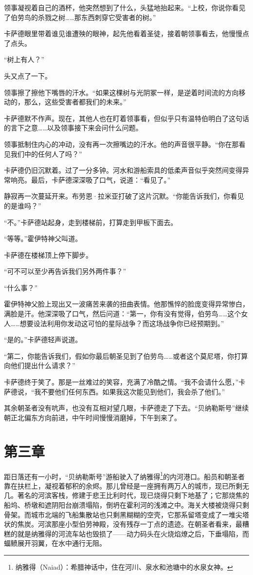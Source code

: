 \documentclass[AutoFakeBold=true]{book}
\begin{document}
领事凝视着自己的酒杯，他突然想到了什么，头猛地抬起来。``上校，你说你看见了伯劳鸟的杀戮之树……那东西刺穿它受害者的树。''

卡萨德眼里带着谁见谁遭殃的眼神，起先他看着圣徒，接着朝领事看去，他慢慢点了点头。

``树上有人？''

头又点了一下。

领事擦了擦他下嘴唇的汗水。``如果这棵树与光阴冢一样，是逆着时间流的方向移动的，那么，这些受害者都我们的未来。''

卡萨德默不作声。现在，其他人也在盯着领事看，但似乎只有温特伯明白了这句话的言下之意……以及领事接下来会问什么问题。

领事抵制住内心的冲动，没有再一次擦嘴边的汗水。他的声音很平静。``你在那看见我们中的任何人了吗？''

卡萨德仍旧沉默着。过了一分多钟。河水和游船索具的低柔声音似乎突然间变得异常响亮。最后，卡萨德深深吸了口气，说道：``看见了。''

静寂再一次蔓延开来。布劳恩·拉米亚打破了这片沉默。``你能告诉我们，你看见的是谁吗？''

``不。''卡萨德站起身，走到楼梯前，打算走到甲板下面去。

``等等。''霍伊特神父叫道。

卡萨德在楼梯顶上停下脚步。

``可不可以至少再告诉我们另外两件事？''

``什么事？''

霍伊特神父脸上现出又一波痛苦来袭的扭曲表情。他那憔悴的脸庞变得异常惨白，满脸是汗。他深深吸了口气，然后问道：``第一，你有没有觉得，伯劳鸟……这个女人……想要设法利用你发动这可怕的星际战争？而这场战争你已经预期到。''

``是的。''卡萨德轻声说道。

``第二，你能告诉我们，假如你最后朝圣见到了伯劳鸟……或者这个莫尼塔，你打算向他们提出什么请求？''

卡萨德终于笑了。那是一丝难过的笑容，充满了冷酷之情。``我不会请什么愿，''卡萨德说，``我不要他们任何东西。如果我这次能见到他们，我会杀了他们。''

其余朝圣者没有吭声，也没有互相对望几眼，卡萨德走了下去。``贝纳勒斯号''继续朝正北偏东方向前进，中午时间慢慢消磨掉，下午到来了。

\chapter{第三章}

距日落还有一小时，``贝纳勒斯号''游船驶入了纳雅得\footnote{纳雅得（Naiad）：希腊神话中，住在河川、泉水和池塘中的水泉女神。}的内河港口。船员和朝圣者靠在扶栏上，凝视着郁积的余烬。那儿曾经是一座拥有两万人的城市，现已所剩无几。著名的河滨客栈，修建于悲王比利时代，现已烧得只剩下地基了；它那烧焦的船坞、桥墩和遮阴阳台崩溃塌陷，倒坍在霍利河的浅滩之中。海关大楼被烧得只剩骨架。而城市北端的飞船集散站也只剩黑糊糊的空壳，它那系留塔变成了一堆尖塔状的焦炭。河滨那座小型伯劳神殿，没有残存一丁点的遗迹。在朝圣者看来，最糟糕的就是纳雅得的河流车站也毁损了——动力码头在火烧焰燎之后，下垂塌陷，而蝠鲼展开羽翼，在水中通行无阻。
\end{document}

